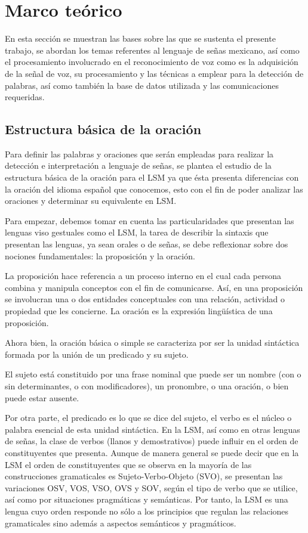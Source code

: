 
\section{Marco teórico}

En esta sección se muestran las bases sobre las que se sustenta el presente trabajo, se abordan los temas referentes al lenguaje de señas mexicano, así como el procesamiento involucrado en el reconocimiento de voz como es la adquisición de la señal de voz, su procesamiento y las técnicas a emplear para la detección de palabras, así como también la base de datos utilizada y las comunicaciones requeridas.

\subsection {Estructura básica de la oración}

Para definir las palabras y oraciones que serán empleadas para realizar la detección e interpretación a lenguaje de señas, se plantea el estudio de la estructura básica de la oración para el LSM ya que ésta presenta diferencias con la oración del idioma español que conocemos, esto con el fin de poder analizar las oraciones y determinar su equivalente en LSM.

Para empezar, debemos tomar en cuenta las particularidades que presentan las lenguas viso gestuales como el LSM, la tarea de describir la sintaxis que presentan las lenguas, ya sean orales o de señas, se debe reflexionar sobre dos nociones fundamentales: la proposición y la oración.

La proposición hace referencia a un proceso interno en el cual cada persona combina y manipula conceptos con el fin de comunicarse. Así, en una proposición se involucran una o dos entidades conceptuales con una relación, actividad o propiedad que les concierne. La oración es la expresión lingüística de una proposición.

Ahora bien, la oración básica o simple se caracteriza por ser la unidad sintáctica formada por la unión de un predicado y su sujeto.

El sujeto está constituido por una frase nominal que puede ser un nombre (con o sin determinantes, o con modificadores), un pronombre, o una oración, o bien puede estar ausente.

Por otra parte, el predicado es lo que se dice del sujeto, el verbo es el núcleo o palabra esencial de esta unidad sintáctica. En la LSM, así como en otras lenguas de señas, la clase de verbos (llanos y demostrativos) puede influir en el orden de constituyentes que presenta. Aunque de manera general se puede decir que en la LSM el orden de constituyentes que se observa en la mayoría de las construcciones gramaticales es Sujeto-Verbo-Objeto (SVO), se presentan las variaciones OSV, VOS, VSO, OVS y SOV, según el tipo de verbo que se utilice, así como por situaciones pragmáticas y semánticas. Por tanto, la LSM es una lengua cuyo orden responde no sólo a los principios que regulan las relaciones gramaticales sino además a aspectos semánticos y pragmáticos. \cite{Aldrete2008}

